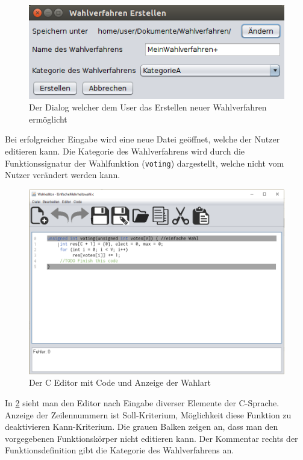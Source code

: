 \documentclass[a4paper]{scrreprt}
\begin{document}
\begin{figure}[H]
\includegraphics[scale=0.5]{Wahlverfahren-Erstellen.png}
\caption{Der Dialog welcher dem User das Erstellen neuer Wahlverfahren ermöglicht}
\label{C-Editor-Tool-Streifen}
\end{figure}

Bei erfolgreicher Eingabe wird eine neue Datei geöffnet, welche der Nutzer editieren kann. Die Kategorie des Wahlverfahrens wird durch die Funktionssignatur der Wahlfunktion (\texttt{voting}) dargestellt, welche nicht vom Nutzer verändert werden kann. 

\begin{figure}[H]
\includegraphics[scale=0.4]{Editor-mit-text.png}
\caption{Der C Editor mit Code und Anzeige der Wahlart}
\label{Editor-mit-text}
\end{figure}

In \ref{Editor-mit-text} sieht man den Editor nach Eingabe diverser Elemente der C-Sprache. Anzeige der Zeilennummern ist Soll-Kriterium, Möglichkeit diese Funktion zu deaktivieren Kann-Kriterium. Die grauen Balken zeigen an, dass man den vorgegebenen Funktionskörper nicht editieren kann. Der Kommentar rechts der Funktionsdefinition gibt die Kategorie des Wahlverfahrens an.
\end{document}
